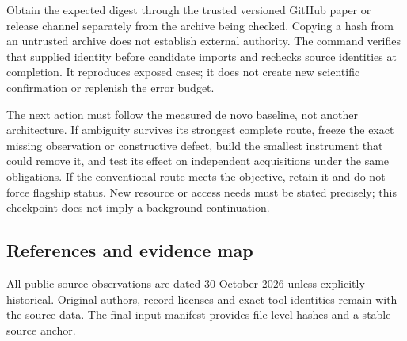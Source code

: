 \documentclass[
  10pt,
]{article}
\begin{document}
Obtain the expected digest through the trusted versioned GitHub paper or
release channel separately from the archive being checked. Copying a
hash from an untrusted archive does not establish external authority.
The command verifies that supplied identity before candidate imports and
rechecks source identities at completion. It reproduces exposed cases;
it does not create new scientific confirmation or replenish the error
budget.

The next action must follow the measured de novo baseline, not another
architecture. If ambiguity survives its strongest complete route, freeze
the exact missing observation or constructive defect, build the smallest
instrument that could remove it, and test its effect on independent
acquisitions under the same obligations. If the conventional route meets
the objective, retain it and do not force flagship status. New resource
or access needs must be stated precisely; this checkpoint does not imply
a background continuation.

\hypertarget{references-and-evidence-map}{%
\subsection{References and evidence
map}\label{references-and-evidence-map}}

All public-source observations are dated 30 October 2026 unless
explicitly historical. Original authors, record licenses and exact tool
identities remain with the source data. The final input manifest
provides file-level hashes and a stable source anchor.
\end{document}
